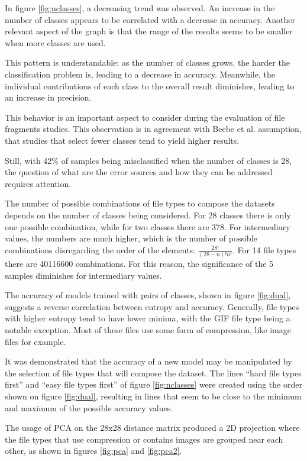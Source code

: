 

In figure \ref{fig:nclasses}, a decreasing trend was observed. An increase in the number of classes appears to be  correlated with a decrease in accuracy. Another relevant aspect of the graph is that the range of the results seems to be smaller when more classes are used.  

This pattern is understandable: as the number of classes grows, the harder the classification problem is, leading to a decrease in accuracy. Meanwhile, the individual contributions of each class to the overall result diminishes, leading to an increase in precision.

This behavior is an important aspect to consider during the evaluation of file fragments studies. This observation is in agreement with Beebe et al. \cite{beebe_sceadan:_2013} assumption, that studies that select fewer classes tend to yield higher results. 

Still, with 42\% of samples being misclassified when the number of classes is 28, the question of what are the error sources and how they can be addressed requires attention.

The number of possible combinations of file types to compose the datasets depends on the number of classes being considered. For 28 classes there is only one possible combination, while for two classes there are 378. For intermediary values, the numbers are much higher, which is the number of possible combinations disregarding the order of the elements: $ \frac{28!}{(28-n)!n!}$. For 14 file types there are 40116600 combinations. For this reason, the significance of the 5 samples diminishes for intermediary values.


The accuracy of models trained with pairs of classes, shown in figure \ref{fig:dual}, suggests a reverse correlation between entropy and accuracy.  Generally, file types with higher entropy tend to have lower minima, with the GIF file type being a notable exception. Most of these files use some form of compression, like image files for example.

It was demonstrated that the accuracy of a new model may be manipulated by the selection of file types that will compose the dataset. The lines ``hard file types first'' and ``easy file types first'' of figure \ref{fig:nclasses} were created using the order shown on figure \ref{fig:dual}, resulting in lines that seem to be close to the minimum and maximum of the possible accuracy values. 


The usage of PCA on the 28x28 distance matrix produced a 2D projection where the file types that use compression or contains images are grouped near each other, as shown in figures \ref{fig:pca} and \ref{fig:pca2}.
